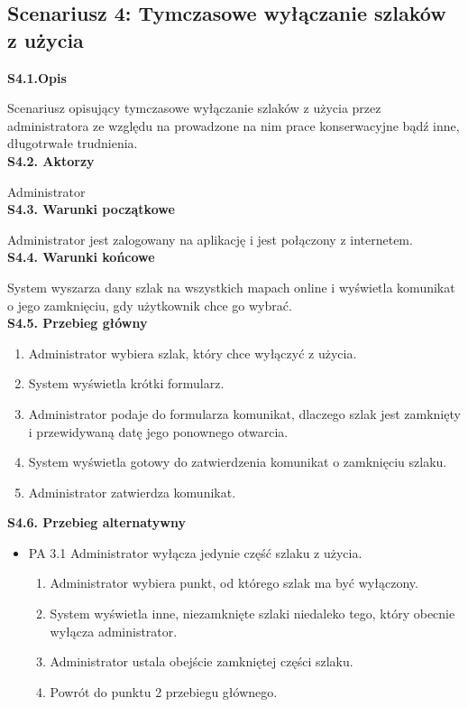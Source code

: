     \subsection*{Scenariusz 4: Tymczasowe wyłączanie szlaków z użycia}
    \noindent
    \textbf{S4.1.Opis} \par
    Scenariusz opisujący tymczasowe wyłączanie szlaków z użycia przez administratora ze względu na prowadzone na nim prace konserwacyjne bądź inne, długotrwałe trudnienia. \\
    \textbf{S4.2. Aktorzy} \par
    Administrator \\
    \textbf{S4.3. Warunki początkowe} \par
    Administrator jest zalogowany na aplikację i jest połączony z internetem. \\
    \textbf{S4.4. Warunki końcowe} \par
    System wyszarza dany szlak na wszystkich mapach online i wyświetla komunikat o jego zamknięciu, gdy użytkownik chce go wybrać.\\
    \textbf{S4.5. Przebieg główny} \par
    \begin{enumerate}
        \item Administrator wybiera szlak, który chce wyłączyć z użycia.
        \item System wyświetla krótki formularz.
        \item Administrator podaje do formularza komunikat, dlaczego szlak jest zamknięty i przewidywaną datę jego ponownego otwarcia.
        \item System wyświetla gotowy do zatwierdzenia komunikat o zamknięciu szlaku.
        \item Administrator zatwierdza komunikat.
    \end{enumerate}
    \textbf{S4.6. Przebieg alternatywny} \par
    \begin{itemize}
        \item []PA 3.1 Administrator wyłącza jedynie część szlaku z użycia.
        \begin{enumerate}
            \item Administrator wybiera punkt, od którego szlak ma być wyłączony.
            \item System wyświetla inne, niezamknięte szlaki niedaleko tego, który obecnie wyłącza administrator.
            \item Administrator ustala obejście zamkniętej części szlaku.
            \item Powrót do punktu 2 przebiegu głównego.
        \end{enumerate}
    \end{itemize}

